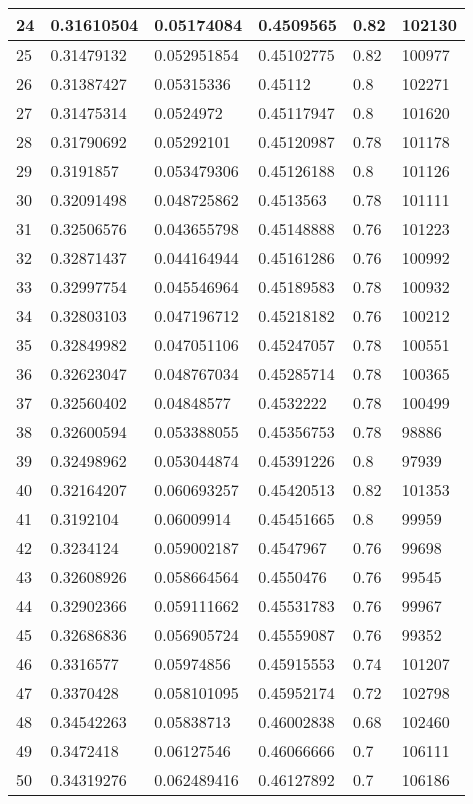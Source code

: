 \begin{longtable}{|l|l|l|l|l|l|}
24 & 0.31610504 & 0.05174084 & 0.4509565 & 0.82 & 102130 \\ \hline 
25 & 0.31479132 & 0.052951854 & 0.45102775 & 0.82 & 100977 \\ \hline 
26 & 0.31387427 & 0.05315336 & 0.45112 & 0.8 & 102271 \\ \hline 
27 & 0.31475314 & 0.0524972 & 0.45117947 & 0.8 & 101620 \\ \hline 
28 & 0.31790692 & 0.05292101 & 0.45120987 & 0.78 & 101178 \\ \hline 
29 & 0.3191857 & 0.053479306 & 0.45126188 & 0.8 & 101126 \\ \hline 
30 & 0.32091498 & 0.048725862 & 0.4513563 & 0.78 & 101111 \\ \hline 
31 & 0.32506576 & 0.043655798 & 0.45148888 & 0.76 & 101223 \\ \hline 
32 & 0.32871437 & 0.044164944 & 0.45161286 & 0.76 & 100992 \\ \hline 
33 & 0.32997754 & 0.045546964 & 0.45189583 & 0.78 & 100932 \\ \hline 
34 & 0.32803103 & 0.047196712 & 0.45218182 & 0.76 & 100212 \\ \hline 
35 & 0.32849982 & 0.047051106 & 0.45247057 & 0.78 & 100551 \\ \hline 
36 & 0.32623047 & 0.048767034 & 0.45285714 & 0.78 & 100365 \\ \hline 
37 & 0.32560402 & 0.04848577 & 0.4532222 & 0.78 & 100499 \\ \hline 
38 & 0.32600594 & 0.053388055 & 0.45356753 & 0.78 & 98886 \\ \hline 
39 & 0.32498962 & 0.053044874 & 0.45391226 & 0.8 & 97939 \\ \hline 
40 & 0.32164207 & 0.060693257 & 0.45420513 & 0.82 & 101353 \\ \hline 
41 & 0.3192104 & 0.06009914 & 0.45451665 & 0.8 & 99959 \\ \hline 
42 & 0.3234124 & 0.059002187 & 0.4547967 & 0.76 & 99698 \\ \hline 
43 & 0.32608926 & 0.058664564 & 0.4550476 & 0.76 & 99545 \\ \hline 
44 & 0.32902366 & 0.059111662 & 0.45531783 & 0.76 & 99967 \\ \hline 
45 & 0.32686836 & 0.056905724 & 0.45559087 & 0.76 & 99352 \\ \hline 
46 & 0.3316577 & 0.05974856 & 0.45915553 & 0.74 & 101207 \\ \hline 
47 & 0.3370428 & 0.058101095 & 0.45952174 & 0.72 & 102798 \\ \hline 
48 & 0.34542263 & 0.05838713 & 0.46002838 & 0.68 & 102460 \\ \hline 
49 & 0.3472418 & 0.06127546 & 0.46066666 & 0.7 & 106111 \\ \hline 
50 & 0.34319276 & 0.062489416 & 0.46127892 & 0.7 & 106186 \\ \hline 
\end{longtable}